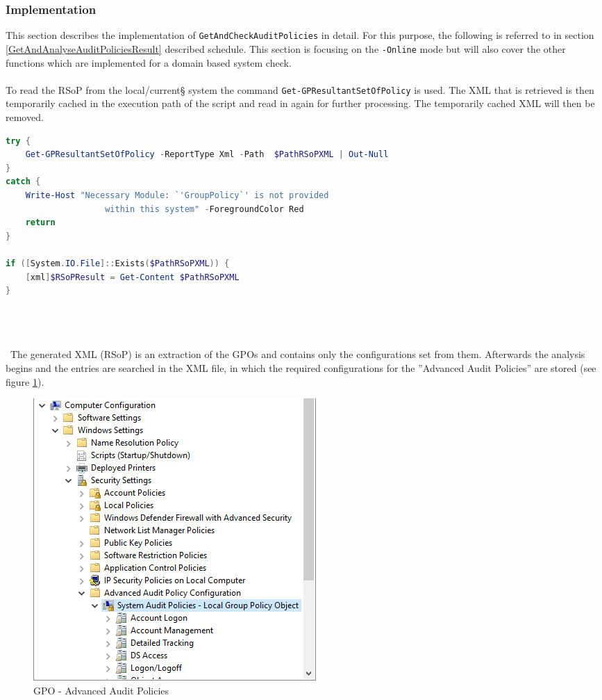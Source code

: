 \subsubsection{Implementation}
This section describes the implementation of \lstinline|GetAndCheckAuditPolicies| in detail. For this purpose, the following is referred to in section \ref{GetAndAnalyseAuditPoliciesResult}  described schedule. This section is focusing on the \lstinline|-Online| mode but will also cover the other functions which are implemented for a domain based system check.
\\\\
To read the RSoP from the local/current§ system the command \lstinline|Get-GPResultantSetOfPolicy| is used. The XML that is retrieved is then temporarily cached in the execution path of the script and read in again for further processing. The temporarily cached XML will then be removed.
\begin{lstlisting}[caption=Get-GPResultantSetOfPolicy, language=PowerShell]
try {
    Get-GPResultantSetOfPolicy -ReportType Xml -Path  $PathRSoPXML | Out-Null
}
catch {
    Write-Host "Necessary Module: `'GroupPolicy`' is not provided 
                    within this system" -ForegroundColor Red
    return
}

if ([System.IO.File]::Exists($PathRSoPXML)) {
    [xml]$RSoPResult = Get-Content $PathRSoPXML
}
\end{lstlisting}
\vspace{0.5cm}
\begin{multicols}{2}
    \ \\\\\\ \
    The generated XML (RSoP) is an extraction of the GPOs and contains only the configurations set from them.
    Afterwards the analysis begins and the entries are searched in the XML file, in which the required configurations for the ''Advanced Audit Policies'' are stored (see figure \ref{fig:AdvancedAuditPolicies}).
    \begin{figure}[H]
        \centering
        \includegraphics[width=0.7\linewidth]{assets/GetAndCheckAuditPolicies/advancedauditpolicies.png}
        \caption{GPO - Advanced Audit Policies}\label{fig:AdvancedAuditPolicies}
    \end{figure}
\end{multicols}
